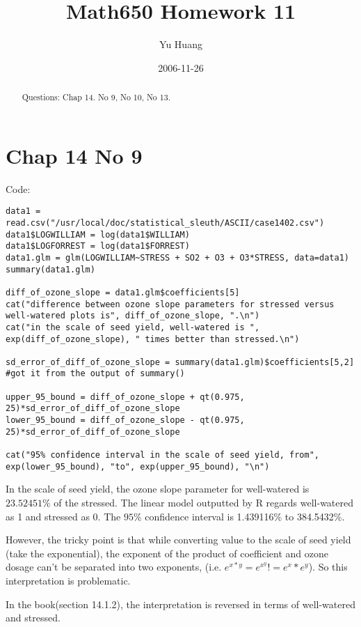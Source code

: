 \documentclass[a4paper,10pt]{article}
\title{Math650 Homework 11}
\author{Yu Huang}
\date{2006-11-26}
\begin{document}
\maketitle

\begin{abstract}
Questions: Chap 14. No 9, No 10, No 13.
\end{abstract}

\section{Chap 14 No 9}
Code:
\begin{verbatim}
data1 = read.csv("/usr/local/doc/statistical_sleuth/ASCII/case1402.csv")
data1$LOGWILLIAM = log(data1$WILLIAM)
data1$LOGFORREST = log(data1$FORREST)
data1.glm = glm(LOGWILLIAM~STRESS + SO2 + O3 + O3*STRESS, data=data1)
summary(data1.glm)

diff_of_ozone_slope = data1.glm$coefficients[5]
cat("difference between ozone slope parameters for stressed versus well-watered plots is", diff_of_ozone_slope, ".\n")
cat("in the scale of seed yield, well-watered is ", exp(diff_of_ozone_slope), " times better than stressed.\n")

sd_error_of_diff_of_ozone_slope = summary(data1.glm)$coefficients[5,2]	#got it from the output of summary()

upper_95_bound = diff_of_ozone_slope + qt(0.975, 25)*sd_error_of_diff_of_ozone_slope
lower_95_bound = diff_of_ozone_slope - qt(0.975, 25)*sd_error_of_diff_of_ozone_slope

cat("95% confidence interval in the scale of seed yield, from", exp(lower_95_bound), "to", exp(upper_95_bound), "\n")
\end{verbatim}

In the scale of seed yield, the ozone slope parameter for well-watered is $23.52451\%$ of the stressed. The linear model outputted by R regards well-watered as 1 and stressed as 0. The $95\%$ confidence interval is 1.439116\% to 384.5432\%.

However, the tricky point is that while converting value to the scale of seed yield (take the exponential), the exponent of the product of coefficient and ozone dosage can't be separated into two exponents, (i.e. $e^{x*y} = e^{x^y} != e^x*e^y$). So this interpretation is problematic.

In the book(section 14.1.2), the interpretation is reversed in terms of well-watered and stressed.
\end{document}
